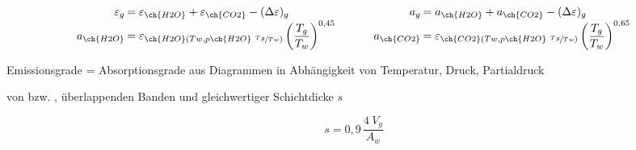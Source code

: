 	\[ \arraycolsep=0.1em  \def\arraystretch{1.3}
	\begin{array}{r l p{3em} r l}
		\varepsilon_g & = \varepsilon_{\ch{H2O}} + \varepsilon_{\ch{CO2}} - (\Delta\varepsilon)_g                           &  & a_g           & = a_{\ch{H2O}} + a_{\ch{CO2}} - (\Delta \varepsilon)_g                                              \\
		a _{\ch{H2O}} & = \varepsilon_{ \ch{H2O} ( Tw , p \ch{H2O}\ \sfrac{Tg}{Tw})}  \left(\dfrac{T_g}{T_w}\right) ^{0,45} &  & a _{\ch{CO2}} & = \varepsilon_{ \ch{CO2} ( Tw , p \ch{H2O}\ \sfrac{Tg}{Tw})}  \left(\dfrac{T_g}{T_w}\right) ^{0,65}
	\end{array}\]



	Emissionsgrade = Absorptionsgrade aus Diagrammen in Abhängigkeit von Temperatur, Druck, Partialdruck

	von  bzw. , überlappenden Banden und gleichwertiger Schichtdicke $ s $

	\[ s= 0,9\, \dfrac{4\ V_g}{A_w} \]



